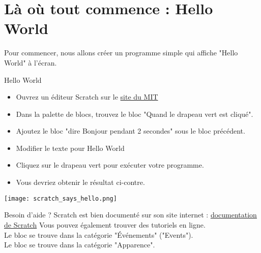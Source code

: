 
\section{Là où tout commence : Hello World}
Pour commencer, nous allons créer un programme simple qui affiche "Hello World" à l'écran.

\begin{UPSTIManipulation}{Hello World}
    \begin{minipage}{.7\textwidth}
        \begin{itemize}
            \item Ouvrez un éditeur Scratch sur le \href{https://scratch.mit.edu/projects/editor}{site du MIT}
            \item Dans la palette de blocs, trouvez le bloc "Quand le drapeau vert est cliqué".
            \item Ajoutez le bloc "dire Bonjour pendant 2 secondes" sous le bloc précédent.
            \item Modifier le texte pour Hello World
            \item Cliquez sur le drapeau vert pour exécuter votre programme.   
            \item Vous devriez obtenir le résultat ci-contre. 
        \end{itemize}
    \end{minipage}\hfill
    \begin{minipage}{.25\textwidth}
        \begin{center}
            \texttt{[image: scratch\_says\_hello.png]}
        \end{center}
    \end{minipage}
\end{UPSTIManipulation}


\begin{UPSTIinfor}{Besoin d'aide ?}
    Scratch est bien documenté sur son site internet : \href{https://scratch.mit.edu/help}{documentation de Scratch} Vous pouvez également trouver des tutoriels en ligne. \\
Le bloc  se trouve dans la catégorie "Événements" ("Events").\\
Le bloc  se trouve dans la catégorie "Apparence".\\
\end{UPSTIinfor}

